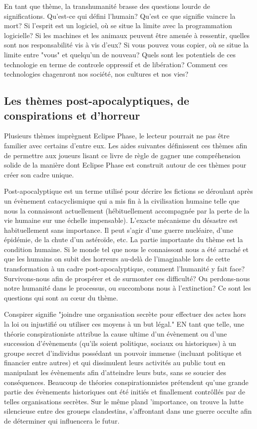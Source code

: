 En tant que thème, la transhumanité brasse des questions lourde de significations. Qu'est-ce qui défini l'humain? Qu'est ce que signifie vaincre la mort? Si l'esprit est un logiciel, où se situe la limite avec la programmation logicielle? Si les machines et les animaux peuvent être amenée à ressentir, quelles sont nos responsabilité vis à vis d'eux? Si vous pouvez vous copier, où se situe la limite entre "vous" et quelqu'un de nouveau? Quels sont les potentiels de ces technologie en terme de contrœle oppressif et de libération? Comment ces technologies chagenront nos société, nos cultures et nos vies? 



\subsection{Les thèmes post-apocalyptiques, de conspirations et d'horreur} \label{sec:post-apoc-consp} 

Plusieurs thèmes imprègnent Eclipse Phase, le lecteur pourrait ne pas être familier avec certains d'entre eux. Les aides suivantes définissent ces thèmes afin de permettre aux joueurs lisant ce livre de règle de gagner une compréhension solide de la manière dont Eclipse Phase est construit autour de ces thèmes pour créer son cadre unique. 

Post-apocalyptique est un terme utilisé pour décrire les fictions se déroulant après un évènement catacyclismique qui a mis fin à la civilisation humaine telle que nous la connaissont actuellement (hébituellement accompagnée par la perte de la vie humaine sur une échelle impensable). L'exacte mécanisme du désastre est habituellement sans importance. Il peut s'agir d'une guerre nucléaire, d'une épidémie, de la chute d'un astéroïde, etc. La partie importante du thème est la condition humaine. Si le monde tel que nous le connaissont nous a été arraché et que les humains on subit des horreurs au-delà de l'imaginable lors de cette transformation à un cadre post-apocalyptique, comment l'humanité y fait face? Survivons-nous afin de prospérer et de surmonter ces difficulté? Ou perdons-nous notre humanité dans le processus, ou succombons nous à l'extinction? Ce sont les questions qui sont au cœur du thème. 

Conspirer signifie "joindre une organisation secrète pour effectuer des actes hors la loi ou injustifié ou utiliser ces moyens à un but légal." EN tant que telle, une théorie conspirationiste attribue la cause ultime d'un évènement ou d'une succession d'évènements (qu'ils soient politique, sociaux ou historiques) à un groupe secret d'individus possédant un pouvoir immense (incluant politique et financier entre autres) et qui dissimulent leurs activités au public tout en manipulant les évènements afin d'atteindre leurs buts, sans se soucier des conséquences. Beaucoup de théories conspirationnistes prétendent qu'une grande partie des évènements historiques ont été initiés et finallement contrôllés par de telles organisations secrètes. Sur le même pland 'importance, on trouve la lutte silencieuse entre des groueps clandestins, s'affrontant dans une guerre occulte afin de déterminer qui influencera le futur. 

